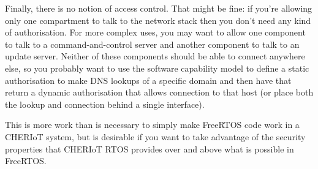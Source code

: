 Finally, there is no notion of access control.
That might be fine: if you're allowing only one compartment to talk to the network stack then you don't need any kind of authorisation.
For more complex uses, you may want to allow one component to talk to a command-and-control server and another component to talk to an update server.
Neither of these components should be able to connect anywhere else, so you probably want to use the software capability model to define a static authorisation to make DNS lookups of a specific domain and then have that return a dynamic authorisation that allows connection to that host (or place both the lookup and connection behind a single interface).

This is more work than is necessary to simply make FreeRTOS code work in a CHERIoT system, but is desirable if you want to take advantage of the security properties that CHERIoT RTOS provides over and above what is possible in FreeRTOS.
